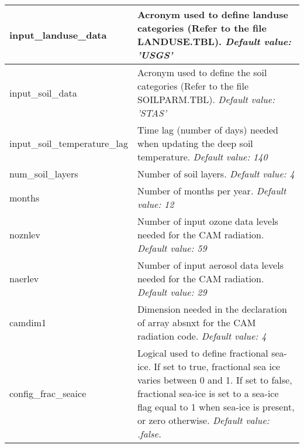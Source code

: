 {\small
\begin{longtable}{|p{2.0in} |p{4.25in}|}
 \hline
  input\_landuse\_data         &   Acronym used to define landuse categories \hfill\break (Refer to the file LANDUSE.TBL). \newline 
  {\em Default value: 'USGS'} \\ \hline

  input\_soil\_data         &  Acronym used to define the soil categories \hfill\break (Refer to the file SOILPARM.TBL).  \newline 
  {\em Default value: 'STAS'} \\ \hline  

  input\_soil\_temperature\_lag &  Time lag (number of days) needed when updating the deep soil temperature.  \newline 
  {\em Default value: 140} \\ \hline

  num\_soil\_layers         & Number of soil layers. \newline 
  {\em Default value: 4} \\ \hline 
  
  months         &  Number of months per year. \newline 
  {\em Default value: 12} \\ \hline   
  
  noznlev         &  Number of input ozone data levels needed for the CAM radiation. \newline 
  {\em Default value: 59} \\ \hline
  
  naerlev         &  Number of input aerosol data levels needed for the CAM radiation.  \newline 
  {\em Default value: 29} \\ \hline
  
  camdim1         &  Dimension needed in the declaration of array absnxt for the CAM radiation code. \newline 
  {\em Default value: 4} \\ \hline
         
  config\_frac\_seaice &  Logical used to define fractional sea-ice. If set to true, fractional sea ice varies between 0 and 1. If set to false, fractional sea-ice is set to a sea-ice flag equal to 1 when sea-ice is present, or zero otherwise. \newline 
  {\em Default value: .false.} \\ \hline


\end{longtable}}
